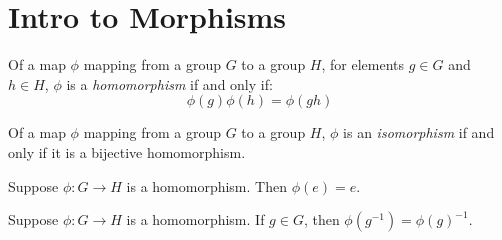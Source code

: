 \section{Intro to Morphisms}

\begin{definition}[Homomorphism]
    \label{definition : Homomorphism}
    \leanok
    Of a map \( \phi \) mapping from a group \( G \) to a group \( H \), for
    elements \( g \in G \) and \( h \in H \), \( \phi \) is a
    \emph{homomorphism} if and only if:
    \[
        \phi(g)\phi(h) = \phi(gh)
    \]
\end{definition}

\begin{definition}[Isomorphism]
    \label{definition : Isomorphism}
    \leanok
    Of a map \( \phi \) mapping from a group \( G \) to a group \( H \), \( \phi
    \) is an \emph{isomorphism} if and only if it is a bijective homomorphism.
\end{definition}

\begin{theorem}
    \label{theorem : hom_id_to_id}
    \leanok
    Suppose \( \phi : G \rightarrow H \) is a homomorphism. Then \( \phi(e) = e \).
\end{theorem}

\begin{theorem}
    \label{theorem : hom_inv_to_inv}
    \leanok
    Suppose \( \phi : G \rightarrow H \) is a homomorphism. If \(g \in G \), then \( \phi(g^{-1}) = \phi(g)^{-1} \).
\end{theorem}
